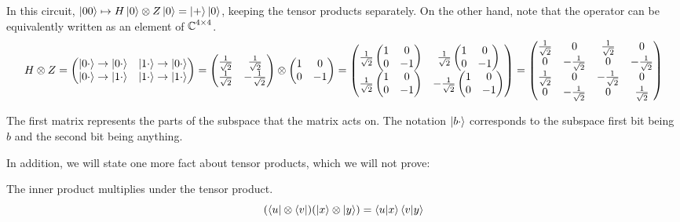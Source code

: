 In this circuit, $\ket{00} \mapsto H\ket{0} \otimes Z\ket{0} = \ket{+}\ket{0}$, keeping the tensor products separately.
On the other hand, note that the operator can be equivalently written as an element of $\operatorname{\mathbb{C}}^{4\times 4}$.
\[ H \otimes Z = \begin{pmatrix}
    \ket{0 \cdot} \to \ket{0 \cdot} & \ket{1 \cdot} \to \ket{0 \cdot} \\
    \ket{0 \cdot} \to \ket{1 \cdot} & \ket{1 \cdot} \to \ket{1 \cdot}
\end{pmatrix} = \begin{pmatrix}
    \frac{1}{\sqrt{2}} & \frac{1}{\sqrt{2}} \\ \frac{1}{\sqrt{2}} & -\frac{1}{\sqrt{2}}
\end{pmatrix} \otimes \begin{pmatrix}
    1 & 0 \\ 0 & -1
\end{pmatrix} = \begin{pmatrix}
    \frac{1}{\sqrt{2}} \begin{pmatrix}
        1 & 0 \\ 0 & -1
    \end{pmatrix} & \frac{1}{\sqrt{2}} \begin{pmatrix}
        1 & 0 \\ 0 & -1
    \end{pmatrix} \\
    \frac{1}{\sqrt{2}} \begin{pmatrix}
        1 & 0 \\ 0 & -1
    \end{pmatrix} & -\frac{1}{\sqrt{2}} \begin{pmatrix}
        1 & 0 \\ 0 & -1
    \end{pmatrix} \\
\end{pmatrix} = \begin{pmatrix}
    \frac{1}{\sqrt{2}} & 0 & \frac{1}{\sqrt{2}} & 0 \\ 0 & -\frac{1}{\sqrt{2}} & 0 & -\frac{1}{\sqrt{2}} \\ \frac{1}{\sqrt{2}} & 0 & -\frac{1}{\sqrt{2}} & 0 \\ 0 & -\frac{1}{\sqrt{2}} & 0 & \frac{1}{\sqrt{2}}
\end{pmatrix} \]

The first matrix represents the parts of the subspace that the matrix acts on. The notation $\ket{b \cdot}$ corresponds to the subspace first bit being $b$ and the second bit being anything.

In addition, we will state one more fact about tensor products, which we will not prove:
\begin{theorem}
    The inner product multiplies under the tensor product.
    \[ (\bra{u} \otimes \bra{v})(\ket{x} \otimes \ket{y}) = \braket{u}{x} \braket{v}{y}\]
\end{theorem}

